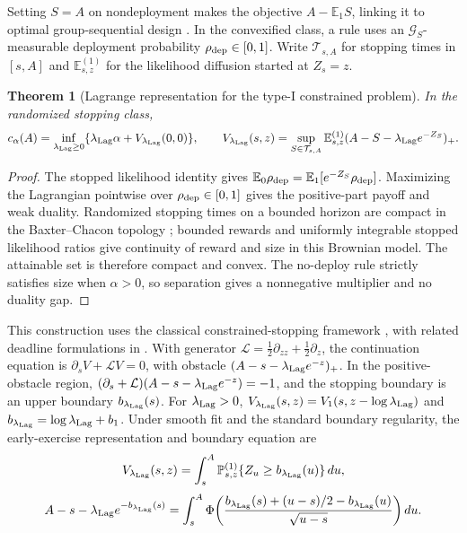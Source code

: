 \documentclass[11pt]{article}
\numberwithin{equation}{section}
\theoremstyle{plain}
\newtheorem{theorem}{Theorem}[section]
\theoremstyle{definition}
\theoremstyle{remark}
\newcommand{\Ezero}{\mathbb E_0}
\newcommand{\Eone}{\mathbb E_1}
\begin{document}
Setting $S=A$ on nondeployment makes the objective $A-\Eone S$, linking it to optimal group-sequential design \cite{ealesjennison1992,barberjennison2002,hamjasinzhao2026}. In the convexified class, a rule uses an $\mathcal G_S$-measurable deployment probability $\rho_{\rm dep}\in[0,1]$. Write $\mathcal T_{s,A}$ for stopping times in $[s,A]$ and $\mathbb E^{(1)}_{s,z}$ for the likelihood diffusion started at $Z_s=z$.
\begin{theorem}[Lagrange representation for the type-I constrained problem]
In the randomized stopping class,
\[
c_\alpha(A)=\inf_{\lambda_{\rm Lag}\ge0}\{\lambda_{\rm Lag}\alpha+V_{\lambda_{\rm Lag}}(0,0)\},\qquad
V_{\lambda_{\rm Lag}}(s,z)=\sup_{S\in\mathcal T_{s,A}}\mathbb E^{(1)}_{s,z}(A-S-\lambda_{\rm Lag}e^{-Z_S})_+.
\]
\end{theorem}
\begin{proof}
The stopped likelihood identity gives $\Ezero\rho_{\rm dep}=\Eone[e^{-Z_S}\rho_{\rm dep}]$. Maximizing the Lagrangian pointwise over $\rho_{\rm dep}\in[0,1]$ gives the positive-part payoff and weak duality. Randomized stopping times on a bounded horizon are compact in the Baxter--Chacon topology \cite{baxterchacon1977}; bounded rewards and uniformly integrable stopped likelihood ratios give continuity of reward and size in this Brownian model. The attainable set is therefore compact and convex. The no-deploy rule strictly satisfies size when $\alpha>0$, so separation gives a nonnegative multiplier and no duality gap.
\end{proof}
This construction uses the classical constrained-stopping framework \cite{nachman1980,kennedy1982}, with related deadline formulations in \cite{frazier2007deadline,dayanik2013deadline,ekstromwang2024,campbell2026deadline}. With generator $\mathcal L=\tfrac12\partial_{zz}+\tfrac12\partial_z$, the continuation equation is $\partial_sV+\mathcal LV=0$, with obstacle $(A-s-\lambda_{\rm Lag}e^{-z})_+$. In the positive-obstacle region, $(\partial_s+\mathcal L)(A-s-\lambda_{\rm Lag}e^{-z})=-1$, and the stopping boundary is an upper boundary $b_{\lambda_{\rm Lag}}(s)$. For $\lambda_{\rm Lag}>0$, $V_{\lambda_{\rm Lag}}(s,z)=V_1(s,z-\log\lambda_{\rm Lag})$ and $b_{\lambda_{\rm Lag}}=\log\lambda_{\rm Lag}+b_1$. Under smooth fit and the standard boundary regularity, the early-exercise representation and boundary equation are
\[
V_{\lambda_{\rm Lag}}(s,z)=\int_s^A\mathbb P^{(1)}_{s,z}\{Z_u\ge b_{\lambda_{\rm Lag}}(u)\}\,du,
\]
\[
A-s-\lambda_{\rm Lag}e^{-b_{\lambda_{\rm Lag}}(s)}
=\int_s^A\Phi\!\left(\frac{b_{\lambda_{\rm Lag}}(s)+(u-s)/2-b_{\lambda_{\rm Lag}}(u)}{\sqrt{u-s}}\right)du.
\]
\end{document}
